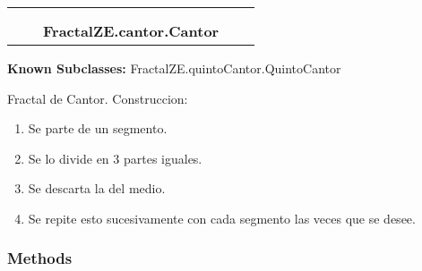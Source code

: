    \label{FractalZE:cantor:Cantor}
\begin{tabular}{cccccc}
\multicolumn{2}{r}{\settowidth{\BCL}{FractalZE.fractal.Fractal}\multirow{2}{\BCL}{FractalZE.fractal.Fractal}}
&&
  \\\cline{3-3}
  &&\multicolumn{1}{c|}{}
&&
  \\
&&\multicolumn{2}{l}{\textbf{FractalZE.cantor.Cantor}}
\end{tabular}

\textbf{Known Subclasses:} FractalZE.quintoCantor.QuintoCantor

Fractal de Cantor. Construccion:

\begin{enumerate}

\setlength{\parskip}{0.5ex}
  \item Se parte de un segmento.

  \item Se lo divide en 3 partes iguales.

  \item Se descarta la del medio.

  \item Se repite esto sucesivamente con cada segmento las veces que se desee.

\end{enumerate}



  \subsubsection{Methods}

    \label{FractalZE:cantor:Cantor:__init__}

    \vspace{0.5ex}

